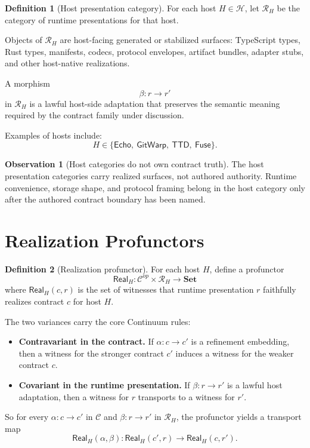\documentclass[11pt]{article}
\newcommand{\Ctr}{\mathcal{C}}
\newcommand{\Host}{\mathcal{H}}
\newcommand{\RHost}[1]{\mathcal{R}_{#1}}
\newcommand{\Set}{\mathbf{Set}}
\newcommand{\Real}{\mathsf{Real}}
\newcommand{\TTD}{\ensuremath{\mathsf{TTD}}}
\newcommand{\Echo}{\ensuremath{\mathsf{Echo}}}
\newcommand{\GitWarp}{\ensuremath{\mathsf{GitWarp}}}
\newcommand{\Fuse}{\ensuremath{\mathsf{Fuse}}}
\theoremstyle{definition}
\newtheorem{definition}{Definition}
\newtheorem{observation}{Observation}
\begin{document}
\begin{definition}[Host presentation category]
For each host $H \in \Host$, let $\RHost{H}$ be the category of runtime
presentations for that host.

Objects of $\RHost{H}$ are host-facing generated or stabilized surfaces:
TypeScript types, Rust types, manifests, codecs, protocol envelopes,
artifact bundles, adapter stubs, and other host-native realizations.

A morphism
\[
\beta : r \to r'
\]
in $\RHost{H}$ is a lawful host-side adaptation that preserves the semantic
meaning required by the contract family under discussion.
\end{definition}

Examples of hosts include:
\[
H \in \{\Echo,\ \GitWarp,\ \TTD,\ \Fuse\}.
\]

\begin{observation}[Host categories do not own contract truth]
The host presentation categories carry realized surfaces, not authored
authority. Runtime convenience, storage shape, and protocol framing belong in
the host category only after the authored contract boundary has been named.
\end{observation}

\section{Realization Profunctors}

\begin{definition}[Realization profunctor]
For each host $H$, define a profunctor
\[
\Real_H : \Ctr^{op} \times \RHost{H} \to \Set
\]
where $\Real_H(c,r)$ is the set of witnesses that runtime presentation $r$
faithfully realizes contract $c$ for host $H$.
\end{definition}

The two variances carry the core Continuum rules:
\begin{itemize}[leftmargin=2em]
\item \textbf{Contravariant in the contract.} If
  $\alpha : c \to c'$ is a refinement embedding, then a witness for the
  stronger contract $c'$ induces a witness for the weaker contract $c$.
\item \textbf{Covariant in the runtime presentation.} If
  $\beta : r \to r'$ is a lawful host adaptation, then a witness for $r$
  transports to a witness for $r'$.
\end{itemize}

So for every $\alpha : c \to c'$ in $\Ctr$ and $\beta : r \to r'$ in
$\RHost{H}$, the profunctor yields a transport map
\[
\Real_H(\alpha,\beta) : \Real_H(c',r) \to \Real_H(c,r').
\]
\end{document}
